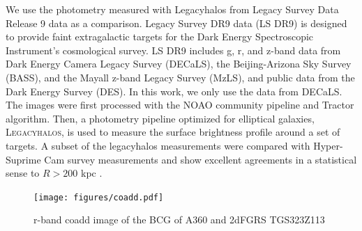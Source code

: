 \documentclass[SE,lsstdraft,authoryear,toc]{lsstdoc}
\begin{document}
We use the photometry measured with Legacyhalos \cite{liReachingEdgeProbing2022,moustakasSienaGalaxyAtlas2023} from Legacy Survey Data Release 9 data as a comparison. Legacy Survey DR9 data (LS DR9) \cite{schlegelDESILegacyImaging2021} is designed to provide faint extragalactic targets for the Dark Energy Spectroscopic Instrument's cosmological survey. LS DR9 includes g, r, and z-band data from Dark Energy Camera Legacy Survey (DECaLS), the Beijing-Arizona Sky Survey (BASS), and the Mayall z-band Legacy Survey (MzLS), and public data from the Dark Energy Survey (DES). In this work, we only use the data from DECaLS. The images were first processed with the NOAO community pipeline and Tractor algorithm. Then, a photometry pipeline optimized for elliptical galaxies, \textsc{Legacyhalos}, is used to measure the surface brightness profile around a set of targets. A subset of the legacyhalos measurements were compared with Hyper-Suprime Cam survey measurements and show excellent agreements in a statistical sense to $R > 200$ kpc \cite{liReachingEdgeProbing2022}. 

\begin{figure}[htbp]
  \centering
  \texttt{[image: figures/coadd.pdf]}
  \caption{r-band coadd image of the BCG of A360 and 2dFGRS TGS323Z113 }
  \label{fig:image}
\end{figure}
\end{document}
